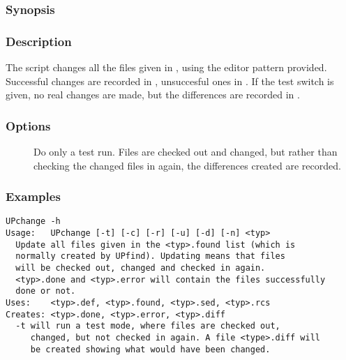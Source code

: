 \subsubsection*{Synopsis}

\begin{synopsis}
\end{synopsis}

\subsubsection*{Description}

\noindent
The  script changes all the files given in ,
using the editor pattern provided. Successful changes are recorded in
, unsuccesful ones in . If the 
test switch is given, no real changes are made, but the differences are
recorded in .

\subsubsection*{Options}

\begin{description}
\item[]
    Do only a test run. Files are checked out and changed, but rather than
    checking the changed files in again, the differences created are recorded.
\end{description}

\subsubsection*{Examples}

\begin{verbatim}
UPchange -h
Usage:   UPchange [-t] [-c] [-r] [-u] [-d] [-n] <typ>
  Update all files given in the <typ>.found list (which is
  normally created by UPfind). Updating means that files
  will be checked out, changed and checked in again.
  <typ>.done and <typ>.error will contain the files successfully
  done or not.
Uses:    <typ>.def, <typ>.found, <typ>.sed, <typ>.rcs
Creates: <typ>.done, <typ>.error, <typ>.diff
  -t will run a test mode, where files are checked out,
     changed, but not checked in again. A file <type>.diff will
     be created showing what would have been changed.
\end{verbatim}

